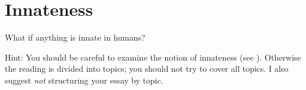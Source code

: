 \documentclass[12pt,\papersize]{extarticle}
\begin{document}
%
%
%
%
%
%
%
%
%
%
%
%
%
%
%
%
%
%
%
%
%

\clearpage

\section{Innateness}
What if anything is innate in humans?

Hint: You should be careful to examine the notion of innateness  (see \citealp{Samuels:2004ho}).  Otherwise the reading is divided into topics; you should not try to cover all topics.  I also suggest \emph{not} structuring your essay by topic.
\end{document}
